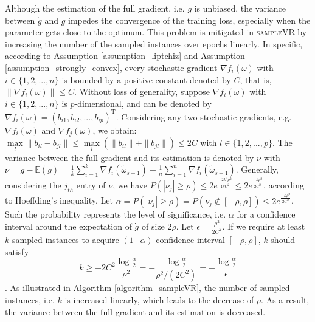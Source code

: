 \documentclass[letterpaper]{article}
\begin{document}
Although the estimation of the full gradient, i.e. $\dot{g}$ is unbiased, the variance between $\dot{g}$ and $g$ impedes the convergence of the training loss, especially when the parameter gets close to the optimum. This problem is mitigated in \textsc{sampleVR} by increasing the number of the sampled instances  over epochs linearly.    In specific, according to Assumption \ref{assumption_liptchiz} and Assumption \ref{assumption_strongly_convex}, every stochastic gradient $\nabla f_i(\omega)$ with $i\in\{1,2, ..., n\}$ is bounded by a positive constant denoted by $C$, that is, $\parallel  \nabla f_i(\omega)  \parallel \le C$. Without loss of generality, suppose $\nabla f_{i}(\omega)$ with $i\in\{1,2, ..., n\}$ is $p$-dimensional, and can be  denoted by $\nabla f_{i}(\omega)=(b_{i1}, b_{i2}, ..., b_{ip})^{\mathrm{T}}$. Considering any two stochastic gradients, e.g. $\nabla f_i(\omega)$ and $\nabla f_j(\omega)$, we obtain: $\max\limits_{l} \parallel b_{il} -b_{jl}\parallel \mathrm{\le} \max\limits_{l} \left(\parallel b_{il}\parallel+\parallel b_{jl}\parallel\right) \mathrm{\le} 2C$ with $l\in\{1,2, ..., p\}$. The variance between the full gradient and its estimation is denoted by $\nu$ with $\nu = \dot{g}-\mathbb{E}(\dot{g}) = \frac{1}{k}\sum\limits_{i=1}^k\nabla f_i(\tilde{\omega}_{s+1}) - \frac{1}{n}\sum\limits_{i=1}^n\nabla f_i(\tilde{\omega}_{s+1})$. Generally, considering the $j_{th}$ entry of $\nu$,  we have $P( | \nu_j | \ge \rho) \le 2e^{\frac{-2k^2\rho^2}{4kC^2}} \le 2e^{\frac{-k\rho^2}{2C^2}}$, according to Hoeffding's inequality. Let $\alpha = P(| \nu_j | \ge \rho) =  P (\nu_j\notin [-\rho, \rho] ) \le 2e^{\frac{-k\rho^2}{2C^2}}$. Such the probability represents the level of significance, i.e. $\alpha$   for a confidence interval  around the expectation of $\dot{g}$ of size $2\rho$. Let $\epsilon = \frac{\rho^2}{2C^2}$. If we require at least $k$ sampled instances  to acquire $(1\mathrm{-}\alpha)$-confidence interval $[-\rho, \rho]$,  $k$ should satisfy
\begin{equation}
\label{equ_estimate_samples_lower_bound}
k\ge - 2C^2\frac{\log \frac{\alpha}{2}}{\rho^2} = - \frac{\log \frac{\alpha}{2}}{\rho^2/(2C^2)} = - \frac{\log \frac{\alpha}{2}}{\epsilon}
\end{equation}. As illustrated in Algorithm \ref{algorithm_sampleVR}, the number of sampled instances, i.e. $k$ is increased linearly, which leads to the decrease of $\rho$. As a result, the variance between the full gradient and its estimation is decreased.
\end{document}

